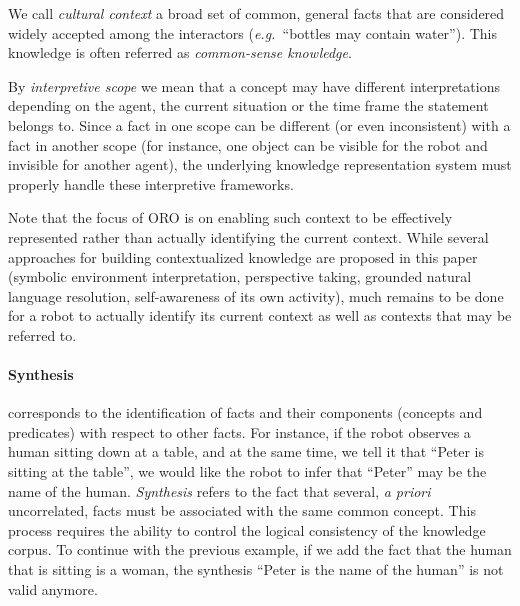 \documentclass{svmult}
\newcommand{\eg}{{\textit{e.g.~}}}
\begin{document}
We call \textit{cultural context} a broad set of common, general facts that are
considered widely accepted among the interactors (\eg ``bottles may contain
water''). This knowledge is often referred as \emph{common-sense knowledge}.

By \emph{interpretive scope} we mean that a concept may have different
interpretations depending on the agent, the current situation or the time frame
the statement belongs to. Since a fact in one scope can be different (or even
inconsistent) with a fact in another scope (for instance, one object can be
visible for the robot and invisible for another agent), the underlying
knowledge representation system must properly handle these interpretive
frameworks.

Note that the focus of ORO is on enabling such context to be
effectively represented rather than actually identifying the current context.
While several approaches for building contextualized knowledge are proposed in this
paper (symbolic environment interpretation, perspective taking, grounded
natural language resolution, self-awareness of its own activity), much remains
to be done for a robot to actually identify its current context as well as
contexts that may be referred to.

\paragraph{Synthesis} corresponds to the identification of facts and their
components (concepts and predicates) with respect to other facts. For instance,
if the robot observes a human sitting down at a table, and at the same time, we
tell it that ``Peter is sitting at the table'', we would like the robot to
infer that ``Peter'' may be the name of the human. \textit{Synthesis}
refers to the fact that several, \textit{a priori} uncorrelated, facts
must be associated with the same common concept. This process requires the
ability to control the logical consistency of the knowledge corpus. To
continue with the previous example,  if we add the fact that the human that
is sitting is a woman, the synthesis ``Peter is the name of the human'' is
not valid anymore.
\end{document}
